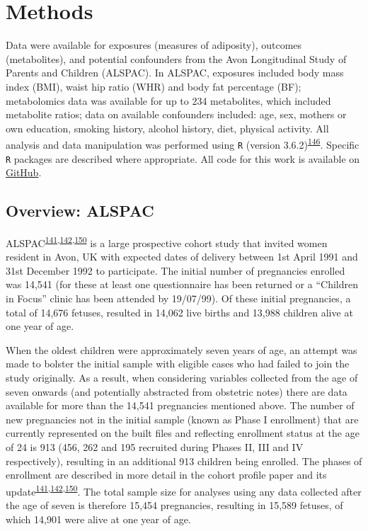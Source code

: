 \documentclass[11pt,twoside]{bristolthesis}
\begin{document}
\newpage

\hypertarget{methods}{%
\section{Methods}\label{methods}}

Data were available for exposures (measures of adiposity), outcomes (metabolites), and potential confounders from the Avon Longitudinal Study of Parents and Children (ALSPAC). In ALSPAC, exposures included body mass index (BMI), waist hip ratio (WHR) and body fat percentage (BF); metabolomics data was available for up to 234 metabolites, which included metabolite ratios; data on available confounders included: age, sex, mothers or own education, smoking history, alcohol history, diet, physical activity. All analysis and data manipulation was performed using \texttt{R} (version 3.6.2)\textsuperscript{\protect\hyperlink{ref-r2019}{146}}. Specific \texttt{R} packages are described where appropriate. All code for this work is available on \href{https://github.com/mattlee821/000_thesis/index/data/chapter4}{GitHub}.

\hypertarget{overview-alspac}{%
\subsection{Overview: ALSPAC}\label{overview-alspac}}

ALSPAC\textsuperscript{\protect\hyperlink{ref-Fraser2013}{141},\protect\hyperlink{ref-Boyd2013}{142},\protect\hyperlink{ref-Northstone2019}{150}} is a large prospective cohort study that invited women resident in Avon, UK with expected dates of delivery between 1st April 1991 and 31st December 1992 to participate. The initial number of pregnancies enrolled was 14,541 (for these at least one questionnaire has been returned or a ``Children in Focus'' clinic has been attended by 19/07/99). Of these initial pregnancies, a total of 14,676 fetuses, resulted in 14,062 live births and 13,988 children alive at one year of age.

When the oldest children were approximately seven years of age, an attempt was made to bolster the initial sample with eligible cases who had failed to join the study originally. As a result, when considering variables collected from the age of seven onwards (and potentially abstracted from obstetric notes) there are data available for more than the 14,541 pregnancies mentioned above. The number of new pregnancies not in the initial sample (known as Phase I enrollment) that are currently represented on the built files and reflecting enrollment status at the age of 24 is 913 (456, 262 and 195 recruited during Phases II, III and IV respectively), resulting in an additional 913 children being enrolled. The phases of enrollment are described in more detail in the cohort profile paper and its update\textsuperscript{\protect\hyperlink{ref-Fraser2013}{141},\protect\hyperlink{ref-Boyd2013}{142},\protect\hyperlink{ref-Northstone2019}{150}}. The total sample size for analyses using any data collected after the age of seven is therefore 15,454 pregnancies, resulting in 15,589 fetuses, of which 14,901 were alive at one year of age.
\end{document}
